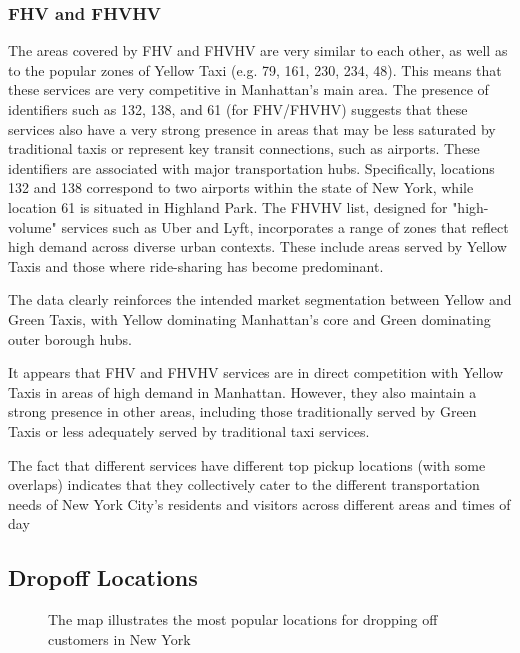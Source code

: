 \documentclass[conference]{IEEEtran}
\begin{document}
\subsubsection*{FHV and FHVHV} The areas covered by FHV and FHVHV are very similar to each other, as well as to the
popular zones of Yellow Taxi (e.g. 79, 161, 230, 234, 48). This means that these services are very competitive in
Manhattan's main area. The presence of identifiers such as 132, 138, and 61 (for FHV/FHVHV) suggests that these services
also have a very strong presence in areas that may be less saturated by traditional taxis or represent key transit
connections, such as airports. These identifiers are associated with major transportation hubs. Specifically, locations
132 and 138 correspond to two airports within the state of New York, while location 61 is situated in Highland Park. The
FHVHV list, designed for "high-volume" services such as Uber and Lyft, incorporates a range of zones that reflect high
demand across diverse urban contexts. These include areas served by Yellow Taxis and those where ride-sharing has become
predominant.

The data clearly reinforces the intended market segmentation between Yellow and Green Taxis, with Yellow dominating
Manhattan's core and Green dominating outer borough hubs.

It appears that FHV and FHVHV services are in direct competition with Yellow Taxis in areas of high demand in Manhattan.
However, they also maintain a strong presence in other areas, including those traditionally served by Green Taxis or
less adequately served by traditional taxi services.

The fact that different services have different top pickup locations (with some overlaps) indicates that they
collectively cater to the different transportation needs of New York City's residents and visitors across
different areas and times of day

\subsection{Dropoff Locations}

\begin{figure}[htbp]
  \label{fig:most-popular-dropoff-locations}
  \centering
  
  \caption{The map illustrates the most popular locations for dropping off customers in New York}
\end{figure}
\end{document}
